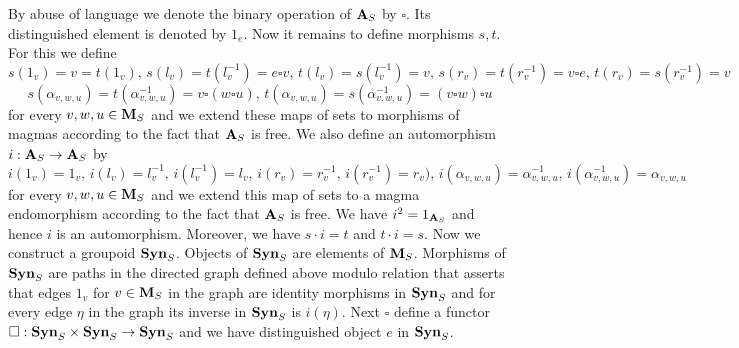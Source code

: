 By abuse of language we denote the binary operation of $\mathbf{A}_S$ by $\square$. Its distinguished element is denoted by $1_e$. Now it remains to define morphisms $s,t$. For this we define
$$s(1_v) = v = t(1_v),\,s(l_v) = t(l_v^{-1}) = e\square v,\,t(l_v) = s(l^{-1}_v) = v,\,s(r_v)= t(r^{-1}_v) = v\square e,\,t(r_v)= s(r^{-1}_v) = v$$
$$s(\alpha_{v,w,u})= t(\alpha^{-1}_{v,w,u})=v\square(w\square u),\,t(\alpha_{v,w,u})= s(\alpha^{-1}_{v,w,u})=(v\square w)\square u$$
for every $v,w,u\in \mathbf{M}_S$ and we extend these maps of sets to morphisms of magmas according to the fact that $\mathbf{A}_S$ is free. We also define an automorphism $i:\mathbf{A}_S\rightarrow \mathbf{A}_S$ by
$$i(1_v)= 1_v,\,i(l_v)=l^{-1}_v,\,i(l^{-1}_v)=l_v,\,i(r_v)=r^{-1}_v,\,i(r^{-1}_v)=r_v),\,i(\alpha_{v,w,u})=\alpha^{-1}_{v,w,u},\,i(\alpha^{-1}_{v,w,u})=\alpha_{v,w,u}$$
for every $v,w,u\in \mathbf{M}_S$ and we extend this map of sets to a magma endomorphism according to the fact that $\mathbf{A}_S$ is free. We have $i^2 = 1_{\mathbf{A}_S}$ and hence $i$ is an automorphism. Moreover, we have $s\cdot i = t$ and $t\cdot i= s$. Now we construct a groupoid $\mathbf{Syn}_S$. Objects of $\mathbf{Syn}_S$ are elements of $\mathbf{M}_S$. Morphisms of $\mathbf{Syn}_S$ are paths in the directed graph defined above modulo relation that asserts that edges $1_v$ for $v\in \mathbf{M}_S$ in the graph are identity morphisms in $\mathbf{Syn}_S$ and for every edge $\eta$ in the graph its inverse in $\mathbf{Syn}_S$ is $i(\eta)$. Next $\square$ define a functor $\square:\mathbf{Syn}_S\times \mathbf{Syn}_S \rightarrow \mathbf{Syn}_S$ and we have distinguished object $e$ in $\mathbf{Syn}_S$.

